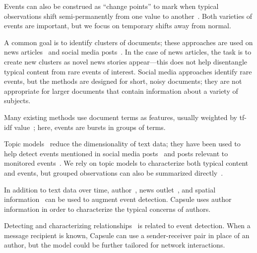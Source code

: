 Events can also be construed as ``change points'' to mark when typical observations shift semi-permanently from one value to another~\cite{guralnik1999event,adams2007bayesian}. Both varieties of events are important, but we focus on temporary shifts away from normal.

A common goal is to identify clusters of documents; these approaches are used on news articles~\cite{zhao2012novel,zhao2007temporal,zhang2002novelty,li2005probabilistic,wang2007mining,allan1998line} and social media posts~\cite{VanDam:2012,lau2012line,jackoway2011identification,sakaki2010earthquake,reuter2012event,becker2010learning,sayyadi2009event}.  
In the case of news articles, the task is to create new clusters as novel news stories appear---this does not help disentangle typical content from rare events of interest.
Social media approaches identify rare events, but the methods are designed for short, noisy documents; they are not appropriate for larger documents that contain information about a variety of subjects.

Many existing methods use document terms as features, usually weighted by tf-idf value~\cite{fung2005parameter,kumaran2004text,brants2003system,das2011dynamic,zhao2007temporal,zhao2012novel}; here, events are bursts in groups of terms. %

Topic models~\cite{Blei:2012} reduce the dimensionality of text data; they have been used to help detect events mentioned in social media posts~\cite{lau2012line,dou2012leadline} and posts relevant to monitored events~\cite{VanDam:2012}.
We rely on topic models to characterize both typical content and events, but grouped observations can also be summarized directly~\cite{peng2007event,chakrabarti2011event,gao2012joint}.

In addition to text data over time, author~\cite{zhao2007temporal}, news outlet~\cite{wang2007mining}, and spatial information~\cite{Neill:2005,mathioudakis2010identifying,liu2011using} can be used to augment event detection.  Capsule uses author information in order to characterize the typical concerns of authors.

Detecting and characterizing relationships~\cite{schein2015bayesian,linderman2014discovering,das2011dynamic} is related to event detection.  When a message recipient is known, Capsule can use a sender-receiver pair in place of an author, but the model could be further tailored for network interactions.

